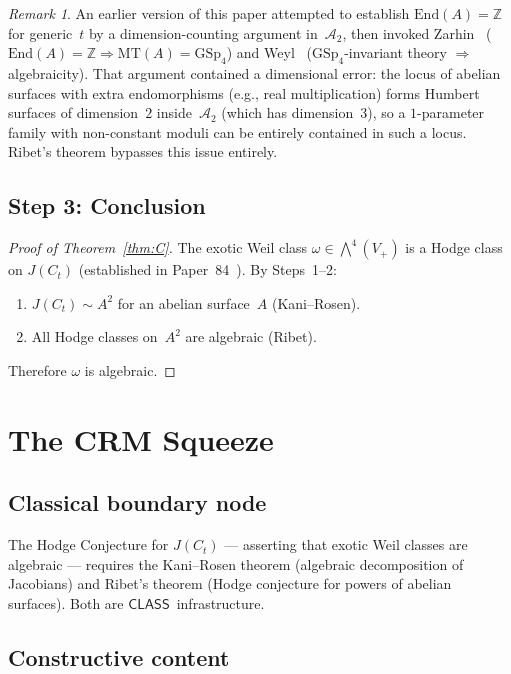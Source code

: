 \documentclass[11pt]{article}
\theoremstyle{plain}
\theoremstyle{definition}
\theoremstyle{remark}
\newtheorem{remark}[theorem]{Remark}
\newcommand{\Z}{\mathbb{Z}}
\newcommand{\GSp}{\mathrm{GSp}}
\newcommand{\End}{\mathrm{End}}
\newcommand{\MT}{\mathrm{MT}}
\newcommand{\CLASS}{\ensuremath{\mathsf{CLASS}}}
\begin{document}
\begin{remark}
An earlier version of this paper attempted to establish
$\End(A) = \Z$ for generic~$t$ by a dimension-counting argument
in~$\mathcal{A}_2$, then invoked Zarhin~\cite{Zarhin83}
($\End(A) = \Z \Rightarrow \MT(A) = \GSp_4$) and
Weyl~\cite{Weyl39} ($\GSp_4$-invariant theory $\Rightarrow$
algebraicity).  That argument contained a dimensional error:
the locus of abelian surfaces with extra endomorphisms
(e.g., real multiplication) forms Humbert surfaces of
dimension~$2$ inside~$\mathcal{A}_2$ (which has dimension~$3$),
so a $1$-parameter family with non-constant moduli can be
entirely contained in such a locus.  Ribet's theorem bypasses
this issue entirely.
\end{remark}

\subsection{Step 3: Conclusion}

\begin{proof}[Proof of Theorem~\ref{thm:C}]
The exotic Weil class $\omega \in \bigwedge^4(V_+)$ is a Hodge
class on $J(C_t)$ (established in Paper~84~\cite{P84}).
By Steps~1--2:
\begin{enumerate}
  \item $J(C_t) \sim A^2$ for an abelian surface~$A$ (Kani--Rosen).
  \item All Hodge classes on~$A^2$ are algebraic (Ribet).
\end{enumerate}
Therefore $\omega$ is algebraic.
\end{proof}

\section{The CRM Squeeze}
\label{sec:squeeze}

\subsection{Classical boundary node}

The Hodge Conjecture for $J(C_t)$ --- asserting that exotic
Weil classes are algebraic --- requires the Kani--Rosen theorem
(algebraic decomposition of Jacobians) and Ribet's theorem
(Hodge conjecture for powers of abelian surfaces).
Both are \CLASS\ infrastructure.

\subsection{Constructive content}
\end{document}
